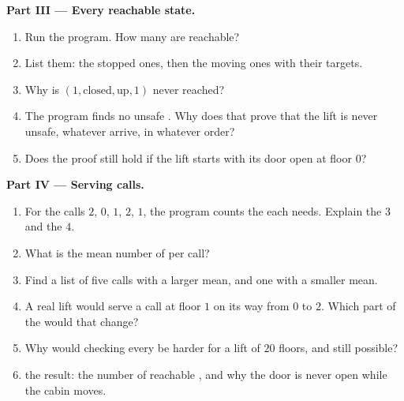 \begin{problem}
\medskip\noindent\textbf{Part III --- Every reachable state.}
\begin{enumerate}[resume]
  \item Run the program. How many  are reachable?
  \item List them: the stopped ones, then the moving ones with their targets.
  \item Why is $(1, \text{closed}, \text{up}, 1)$ never reached?
  \item The program finds no unsafe . Why does that prove that the lift is never unsafe, whatever 
    arrive, in whatever order?
  \item Does the proof still hold if the lift starts with its door open at floor $0$?
\end{enumerate}

\medskip\noindent\textbf{Part IV --- Serving calls.}
\begin{enumerate}[resume]
  \item For the calls $2$, $0$, $1$, $2$, $1$, the program counts the  each needs. Explain the $3$ and the $4$.
  \item What is the mean number of  per call?
  \item Find a list of five calls with a larger mean, and one with a smaller mean.
  \item A real lift would serve a call at floor $1$ on its way from $0$ to $2$. Which part of the  would that
    change?
  \item Why would checking every  be harder for a lift of $20$ floors, and still possible?
  \item {} the result: the number of reachable , and why the door is never open while the cabin moves.
\end{enumerate}
\end{problem}
